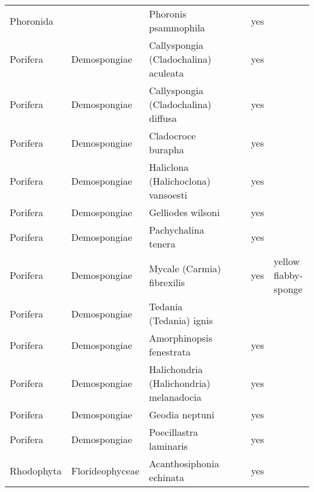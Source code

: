 \begin{longtable}{lllllll}
  Phoronida &  & Phoronis psammophila &  &  & yes &  \\ 
  Porifera & Demospongiae & Callyspongia (Cladochalina) aculeata &  &  & yes &  \\ 
  Porifera & Demospongiae & Callyspongia (Cladochalina) diffusa &  &  & yes &  \\ 
  Porifera & Demospongiae & Cladocroce burapha &  &  & yes &  \\ 
  Porifera & Demospongiae & Haliclona (Halichoclona) vansoesti &  &  & yes &  \\ 
  Porifera & Demospongiae & Gelliodes wilsoni &  &  & yes &  \\ 
  Porifera & Demospongiae & Pachychalina tenera &  &  & yes &  \\ 
  Porifera & Demospongiae & Mycale (Carmia) fibrexilis &  &  & yes & yellow flabby-sponge \\ 
  Porifera & Demospongiae & Tedania (Tedania) ignis &  &  &  &  \\ 
  Porifera & Demospongiae & Amorphinopsis fenestrata &  &  & yes &  \\ 
  Porifera & Demospongiae & Halichondria (Halichondria) melanadocia &  &  & yes &  \\ 
  Porifera & Demospongiae & Geodia neptuni &  &  & yes &  \\ 
  Porifera & Demospongiae & Poecillastra laminaris &  &  & yes &  \\ 
  Rhodophyta & Florideophyceae & Acanthosiphonia echinata &  &  & yes &  \\ 
  \hline
\end{longtable}
\endgroup
